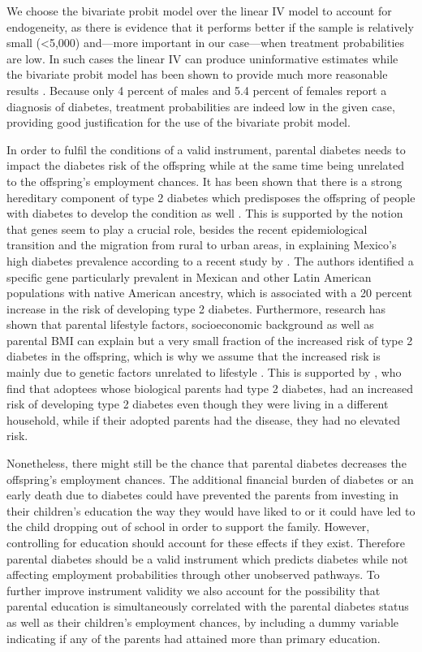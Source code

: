 We choose the bivariate probit model over the linear \ac{IV}
model to account for endogeneity, as there is evidence that it performs
better if the sample is relatively small (<5,000) and---more important
in our case---when treatment probabilities are low. In such cases
the linear \ac{IV} can produce uninformative estimates while the
bivariate probit model has been shown to provide much more reasonable
results \parencite{Chiburis2012}. Because only 4 percent of males and
5.4 percent of females report a diagnosis of diabetes, treatment probabilities
are indeed low in the given case, providing good justification for
the use of the bivariate probit model. 

In order to fulfil the conditions of a valid instrument,
parental diabetes needs to impact the diabetes risk of the offspring
while at the same time being unrelated to the offspring's employment
chances. It has been shown that there is a strong hereditary component
of type 2 diabetes which predisposes the offspring of people with
diabetes to develop the condition as well \parencite{Herder2011,TheInteractConsortium2013}.
This is supported by the notion that genes seem to play a crucial
role, besides the recent epidemiological transition and the migration
from rural to urban areas, in explaining Mexico's high diabetes prevalence
according to a recent study by \textcite{Williams2013}. The authors
identified a specific gene particularly prevalent in Mexican and other
Latin American populations with native American ancestry, which is
associated with a 20 percent increase in the risk of developing type
2 diabetes. Furthermore, research has shown that parental lifestyle
factors, socioeconomic background as well as parental \ac{BMI} can
explain but a very small fraction of the increased risk of type 2
diabetes in the offspring, which is why we assume that the increased
risk is mainly due to genetic factors unrelated to lifestyle \parencite{Herder2011,TheInteractConsortium2013}.
This is supported by \textcite{Hemminki2010}, who find that adoptees
whose biological parents had type 2 diabetes, had an increased risk
of developing type 2 diabetes even though they were living in a different
household, while if their adopted parents had the disease, they had
no elevated risk. 

Nonetheless, there might still be the chance that parental
diabetes decreases the offspring's employment chances. The additional
financial burden of diabetes or an early death due to diabetes could
have prevented the parents from investing in their children's education
the way they would have liked to or it could have led to the child
dropping out of school in order to support the family. However, controlling
for education should account for these effects if they exist. Therefore
parental diabetes should be a valid instrument which predicts diabetes
while not affecting employment probabilities through other unobserved
pathways. To further improve instrument validity we also account for
the possibility that parental education is simultaneously correlated
with the parental diabetes status as well as their children's employment
chances, by including a dummy variable indicating if any of the parents
had attained more than primary education. 

